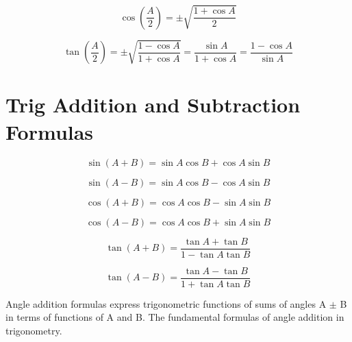 \begin{equation*}
  \cos \left(\frac{A}{2}\right) = \pm \sqrt{\frac{1+\cos A}{2}}
\end{equation*}

\begin{equation*}
  \tan \left(\frac{A}{2}\right) = \pm \sqrt{\frac{1-\cos A}{1+ \cos A}}
  = \frac{\sin A}{1 + \cos A} = \frac{1 - \cos A}{\sin A}
\end{equation*}


\section{Trig Addition and Subtraction Formulas}
\begin{minipage}{0.4\textwidth}
\begin{framed}
  \begin{equation*}
    \sin (A + B) = \sin A \cos B + \cos A \sin B
  \end{equation*}

  \begin{equation*}
    \sin (A - B) = \sin A \cos B - \cos A \sin B
  \end{equation*}

  \begin{equation*}
    \cos (A + B) = \cos A \cos B - \sin A \sin B
  \end{equation*}

  \begin{equation*}
    \cos (A - B) = \cos A \cos B + \sin A \sin B
  \end{equation*}

  \begin{equation*}
    \tan (A + B) = \frac{\tan A + \tan B}{1 - \tan A \tan B}
  \end{equation*}

  \begin{equation*}
    \tan (A - B) = \frac{\tan A - \tan B}{1 + \tan A \tan B}
  \end{equation*}
\vspace{0.5cm}
\end{framed}
\end{minipage}
\begin{minipage}{0.4\textwidth}
\begin{framed}
  Angle addition formulas express trigonometric functions of sums of angles
  A $\pm$ B in terms of functions of A and B. The fundamental formulas of angle 
  addition in trigonometry. 
\end{framed}
\end{minipage}


